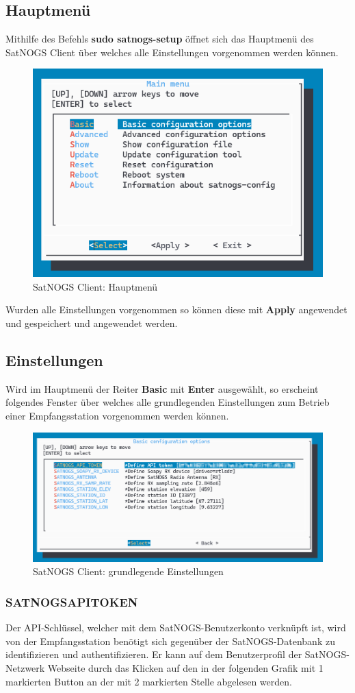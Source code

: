 \subsection{Hauptmenü}
Mithilfe des Befehls \textbf{sudo satnogs-setup} öffnet sich das Hauptmenü des SatNOGS Client über welches alle Einstellungen vorgenommen werden können.

\begin{figure} [H]
	\centering
	\includegraphics[width=.5\linewidth]{../ref/mainmenu.png}
	\caption{SatNOGS Client: Hauptmenü}
	\label{fig:mainmenu}
\end{figure}

Wurden alle Einstellungen vorgenommen so können diese mit \textbf{Apply} angewendet und gespeichert und angewendet werden.

\subsection{Einstellungen}
Wird im Hauptmenü der Reiter \textbf{Basic} mit \textbf{Enter} ausgewählt, so erscheint folgendes Fenster über welches alle grundlegenden Einstellungen zum Betrieb einer Empfangsstation vorgenommen werden können.

\begin{figure} [H]
	\centering
	\includegraphics[width=.75\linewidth]{../ref/basic_configurations.png}
	\caption{SatNOGS Client: grundlegende Einstellungen}
	\label{fig:basic_configurations}
\end{figure}

\subsubsection{SATNOGS\textunderscore API\textunderscore TOKEN}
Der API-Schlüssel, welcher mit dem SatNOGS-Benutzerkonto verknüpft ist, wird von der Empfangsstation benötigt sich gegenüber der SatNOGS-Datenbank zu identifizieren und authentifizieren. Er kann auf dem Benutzerprofil der SatNOGS-Netzwerk Webseite durch das Klicken auf den in der folgenden Grafik mit 1 markierten Button an der mit 2 markierten Stelle abgelesen werden.

